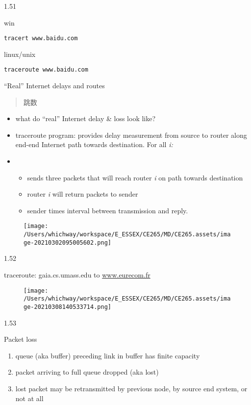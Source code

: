 \documentclass[
]{article}
\begin{document}
1.51

win

\begin{verbatim}
tracert www.baidu.com	
\end{verbatim}

linux/unix

\begin{verbatim}
traceroute www.baidu.com
\end{verbatim}

``Real'' Internet delays and routes

\begin{quote}
跳数
\end{quote}

\begin{itemize}
\item
  what do ``real'' Internet delay \& loss look like?
\item
  traceroute program: provides delay measurement from source to router
  along end-end Internet path towards destination. For all \emph{i:}
\item
  \begin{itemize}
  \item
    sends three packets that will reach router \emph{i} on path towards
    destination
  \item
    router \emph{i} will return packets to sender
  \item
    sender times interval between transmission and reply.
  \end{itemize}
\end{itemize}

\begin{figure}
\centering
\texttt{[image: /Users/whichway/workspace/E\_ESSEX/CE265/MD/CE265.assets/image-20210302095005602.png]}
\caption{}
\end{figure}

1.52

traceroute: gaia.cs.umass.edu to \url{www.eurecom.fr}

\begin{figure}
\centering
\texttt{[image: /Users/whichway/workspace/E\_ESSEX/CE265/MD/CE265.assets/image-20210308140533714.png]}
\caption{}
\end{figure}

1.53

Packet loss

\begin{enumerate}
\def\labelenumi{\arabic{enumi}.}
\item
  queue (aka buffer) preceding link in buffer has finite capacity
\item
  packet arriving to full queue dropped (aka lost)
\item
  lost packet may be retransmitted by previous node, by source end
  system, or not at all
\end{enumerate}
\end{document}

